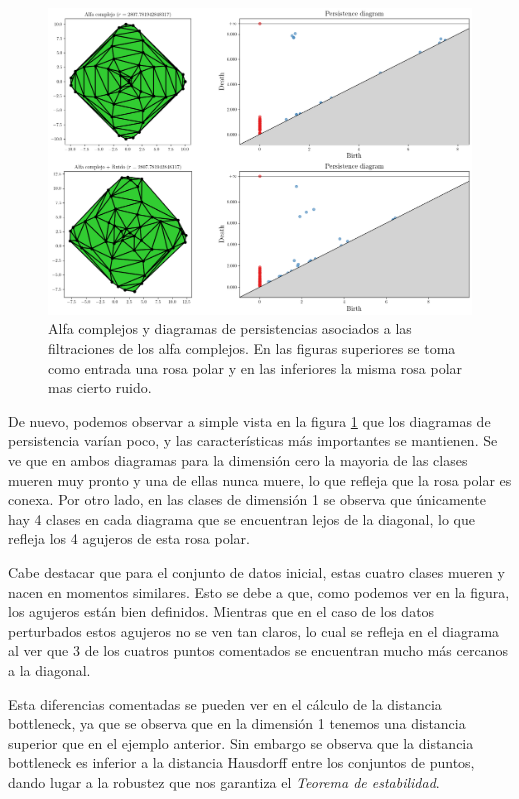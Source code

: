 \begin{figure}[!ht]
\centering
\includegraphics[width=\textwidth]{../code/output/ejemplo2.png} 
\caption{Alfa complejos y diagramas de persistencias asociados a las filtraciones de los alfa complejos. En las figuras superiores se toma como entrada una rosa polar y en las inferiores la misma rosa polar mas cierto ruido.}
\label{ref:persEj2}
\end{figure} 

De nuevo, podemos observar a simple vista en la figura \ref{ref:persEj2} que los diagramas de persistencia varían poco, y las características más importantes se mantienen. Se ve que en ambos diagramas para la dimensión cero la mayoria de las clases mueren muy pronto y una de ellas nunca muere, lo que refleja que la rosa polar es conexa. Por otro lado, en las clases de dimensión 1 se observa que únicamente hay 4 clases en cada diagrama que se encuentran lejos de la diagonal, lo que refleja los 4 agujeros de esta rosa polar.

Cabe destacar que para el conjunto de datos inicial, estas cuatro clases mueren y nacen en momentos similares. Esto se debe a que, como podemos ver en la figura, los agujeros están bien definidos. Mientras que en el caso de los datos perturbados estos agujeros no se ven tan claros, lo cual se refleja en el diagrama al ver que 3 de los cuatros puntos comentados se encuentran mucho más cercanos a la diagonal.

Esta diferencias comentadas se pueden ver en el cálculo de la distancia bottleneck, ya que se observa que en la dimensión 1 tenemos una distancia superior que en el ejemplo anterior. Sin embargo se observa que la distancia bottleneck es inferior a la distancia Hausdorff entre los conjuntos de puntos, dando lugar a la robustez que nos garantiza el \emph{Teorema de estabilidad}.

